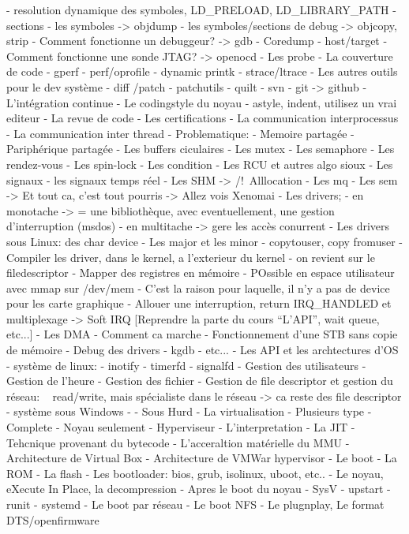 \documentclass[10pt,ucs,usepdftitle=false]{beamer}
\begin{document}
    - resolution dynamique des symboles, LD_PRELOAD, LD_LIBRARY_PATH
    - sections
    - les symboles  -> objdump
    - les symboles/sections de debug -> objcopy, strip
    - Comment fonctionne un debuggeur? -> gdb 
      - Coredump
      - host/target
    - Comment fonctionne une sonde JTAG? -> openocd
    - Les probe
    - La couverture de code
    - gperf
    - perf/oprofile
    - dynamic printk
    - strace/ltrace
    - Les autres outils pour le dev système
       - diff /patch
       - patchutils
       - quilt
       - svn
       - git -> github
       - L'intégration continue
       - Le codingstyle du noyau
         - astyle, indent, utilisez un vrai editeur
       - La revue de code
       - Les certifications
  - La communication interprocessus
    - La communication inter thread
      - Problematique:
        - Memoire partagée
        - Pariphérique partagée
      - Les buffers ciculaires
      - Les mutex
      - Les semaphore
      - Les rendez-vous
      - Les spin-lock
      - Les condition
      - Les RCU et autres algo sioux
    - Les signaux
      - les signaux temps réel
    - Les SHM -> /!\ Alllocation
    - Les mq
    - Les sem
      -> Et tout ca, c'est tout pourris
      -> Allez vois Xenomai
  - Les drivers;
    - en monotache -> = une bibliothèque, avec eventuellement, une gestion d'interruption (msdos)
    - en multitache -> gere les accès conurrent
    - Les drivers sous Linux: des char device
    - Les major et les minor
    - copytouser, copy fromuser
    - Compiler les driver, dans le kernel, a l'exterieur du kernel
    - on revient sur le filedescriptor
    - Mapper des registres en mémoire
      - POssible en espace utilisateur avec mmap sur /dev/mem
      - C'est la raison pour laquelle, il n'y a pas de device pour les carte graphique
    - Allouer une interruption, return IRQ_HANDLED et multiplexage
      -> Soft IRQ
      [Reprendre la parte du cours ``L'API'', wait queue, etc...]
    - Les DMA
      - Comment ca marche
    - Fonctionnement d'une STB sans copie de mémoire
    - Debug des drivers
      - kgdb
      - etc...
  - Les API et les archtectures d'OS
    - système de linux:
       - inotify
       - timerfd
       - signalfd
       - Gestion des utilisateurs
       - Gestion de l'heure
       - Gestion des fichier
       - Gestion de file descriptor et gestion du réseau: ~ read/write, mais spécialiste dans le réseau -> ca reste des file descriptor
     - système sous Windows
       - 
     - Sous Hurd 
  - La virtualisation
     - Plusieurs type
        - Complete
        - Noyau seulement
        - Hyperviseur
     - L'interpretation
     - La JIT
        - Tehcnique provenant du bytecode
     - L'acceraltion matérielle du MMU
     - Architecture de Virtual Box
     - Architecture de VMWar hypervisor
  - Le boot
     - La ROM
     - La flash
     - Les bootloader: bios, grub, isolinux, uboot, etc..
     - Le noyau, eXecute In Place, la decompression
     - Apres le boot du noyau
       - SysV
       - upstart 
       - runit
       - systemd
     - Le boot par réseau
     - Le boot NFS
     - Le plugnplay, Le format DTS/openfirmware
     
\end{document}
